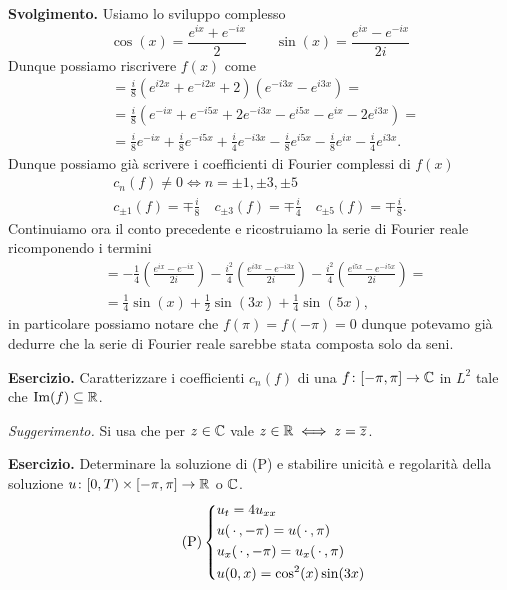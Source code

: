 \textbf{Svolgimento.}
Usiamo lo sviluppo complesso
$$
\cos(x) = \frac{e^{ix} + e^{-ix}}{2}
\qquad
\sin(x) = \frac{e^{ix} - e^{-ix}}{2i}
$$
Dunque possiamo riscrivere $f(x)$ come
$$
\begin{aligned}
	&= \frac{i}{8} \left( e^{i2x} + e^{-i2x} + 2 \right) \left( e^{-i3x} - e^{i3x} \right) = \\
	&= \frac{i}{8} \left( e^{-ix} + e^{-i5x} + 2e^{-i3x} - e^{i5x} - e^{ix} - 2e^{i3x} \right) = \\
	&= \frac{i}{8} e^{-ix} + \frac{i}{8} e^{-i5x} + \frac{i}{4} e^{-i3x} - \frac{i}{8} e^{i5x} - \frac{i}{8} e^{ix} - \frac{i}{4} e^{i3x}. 
\end{aligned}
$$
Dunque possiamo già scrivere i coefficienti di Fourier complessi di $f(x)$
$$
\begin{gathered}
	c_n(f) \neq 0 \iff n = \pm 1, \pm 3, \pm 5 \\
	c_{\pm 1}(f) = \mp\frac{i}{8}  
	\quad
	c_{\pm 3}(f) = \mp\frac{i}{4}
	\quad
	c_{\pm 5}(f) = \mp\frac{i}{8}.
\end{gathered}
$$
Continuiamo ora il conto precedente e ricostruiamo la serie di Fourier reale ricomponendo i termini
$$
\begin{aligned}
	&= -\frac{1}{4}\left( \frac{e^{ix} - e^{-ix}}{2i} \right) -\frac{i^2}{4}\left( \frac{e^{i3x} - e^{-i3x}}{2i} \right) -\frac{i^2}{4}\left( \frac{e^{i5x} - e^{-i5x}}{2i} \right) = \\
	&= \frac{1}{4} \sin(x) + \frac{1}{2} \sin(3x) + \frac{1}{4} \sin(5x),
\end{aligned}
$$
in particolare possiamo notare che $f(\pi) = f(-\pi) = 0$ dunque potevamo già dedurre che la serie di Fourier reale sarebbe stata composta solo da seni.

\textbf{Esercizio.}
Caratterizzare i coefficienti $c_n(f)$ di una $f \colon [-\pi, \pi] \to \mathbb C$ in $L^2$ tale che $\operatorname{Im}(f) \subseteq \mathbb R$.

\textit{Suggerimento.} Si usa che per $z \in \mathbb C$ vale $z \in \mathbb R \iff z = \overline z$.

\textbf{Esercizio.}
Determinare la soluzione di (P) e stabilire unicità e regolarità della soluzione $u \colon [0, T) \times [-\pi, \pi] \to \mathbb R$ o $\mathbb C$.
\begin{equation}
	\tag{P}
	\left\{
	\begin{aligned}
		& u_t = 4 u_{xx} \\
		& u(\,\cdot\,, -\pi) = u(\,\cdot\,, \pi) \\
		& u_x(\,\cdot\,, -\pi) = u_x(\,\cdot\,, \pi) \\
		& u(0, x) = \cos^2(x) \sin(3x)
	\end{aligned}
	\right.
\end{equation}

